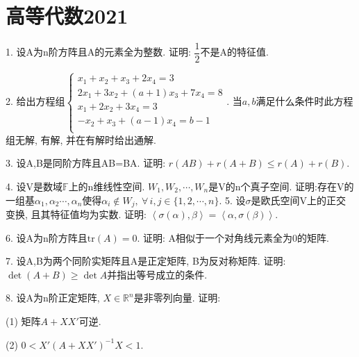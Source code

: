 \documentclass[12pt, a4paper, twoside]{ctexart}%
\begin{document}
	\clearpage
	\section{高等代数2021}
	1. 设A为n阶方阵且A的元素全为整数. 证明: $\dfrac{1}{2}$不是A的特征值.\par
	2. 给出方程组$\begin{cases}
		x_1+x_2+x_3+2x_4=3\\
		2x_1+3x_2+(a+1)x_3+7x_4=8\\
		x_1+2x_2+3x_4=3\\
		-x_2+x_3+(a-1)x_4=b-1\\
	\end{cases}$. 当$a,b$满足什么条件时此方程组无解, 有解, 并在有解时给出通解.\par
	3. 设A,B是同阶方阵且AB=BA. 证明: $r(AB)+r(A+B)\leq r(A)+r(B)$.\par 
	4. 设V是数域$\mathbb{F}$上的n维线性空间. $W_1,W_2,\cdots,W_n$是V的n个真子空间. 证明:存在V的一组基$\alpha_1,\alpha_2\cdots,\alpha_n$使得$\alpha_i\notin W_j,\ \forall\,i,j\in\{1,2,\cdots,n\}$.
	5. 设$\sigma$是欧氏空间V上的正交变换, 且其特征值均为实数. 证明: $\left<\sigma(\alpha),\beta\right>=\left<\alpha,\sigma(\beta)\right>$.\par 
	6. 设A为n阶方阵且$\mathrm{tr}(A)=0$. 证明: A相似于一个对角线元素全为0的矩阵. \par
	7. 设A,B为两个同阶实矩阵且A是正定矩阵, B为反对称矩阵. 证明: $\det(A+B)\ge \det A$并指出等号成立的条件. \par
	8. 设A为n阶正定矩阵, $X\in\mathbb{R}^n$是非零列向量. 证明: \par 
	\hspace{1.2em}(1) 矩阵$A+XX'$可逆.\par
	\hspace{1.2em}(2) $0<X'(A+XX')^{-1}X<1$.\par 
	\clearpage
\end{document}
